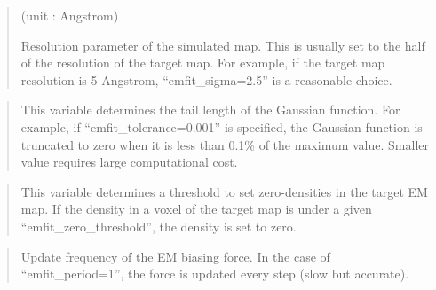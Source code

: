 \documentclass[a4paper,11pt,oneside,english]{sphinxmanual}
\begin{document}
 
\begin{quote}

 (unit : Angstrom)

Resolution parameter of the simulated map.
This is usually set to the half of the resolution of the target map.
For example, if the target map resolution is 5 Angstrom,
“emfit\_sigma=2.5” is a reasonable choice.
\end{quote}

 
\begin{quote}


This variable determines the tail length of the Gaussian function.
For example, if “emfit\_tolerance=0.001” is specified, the Gaussian function is truncated
to zero when it is less than 0.1\% of the maximum value.
Smaller value requires large computational cost.
\end{quote}

 
\begin{quote}


This variable determines a threshold to set zero-densities in the target EM map.
If the density in a voxel of the target map is under a given “emfit\_zero\_threshold”,
the density is set to zero.
\end{quote}

 
\begin{quote}


Update frequency of the EM biasing force.
In the case of “emfit\_period=1”, the force is updated every step (slow but accurate).
\end{quote}
\end{document}
